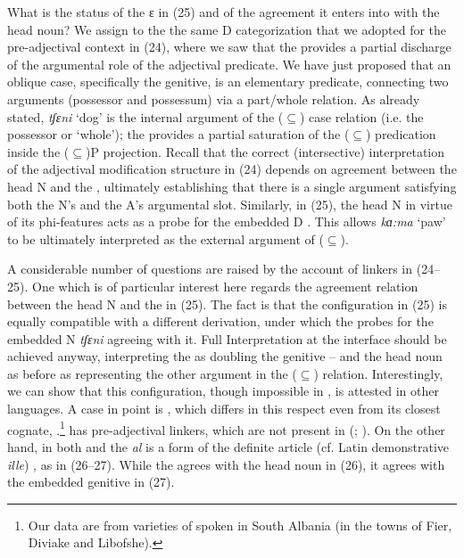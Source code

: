 \documentclass[output=paper]{langsci/langscibook}
\begin{document}
What is the status of the  ɛ in (25) and of the agreement it enters into with the head noun? We assign to the  the same D categorization that we adopted for the pre-ad\-jec\-ti\-val context in (24), where we saw that the  provides a partial discharge of the argumental role of the adjectival predicate. We have just proposed that an oblique case, specifically the genitive, is an elementary predicate, connecting two arguments (possessor and possessum) via a part\slash whole relation. As already stated, \textit{tʃɛni} ‘dog’ is the internal argument of the ($\subseteq$) case relation (i.e. the possessor or ‘whole’); the  provides a partial saturation of the ($\subseteq$) predication inside the ($\subseteq$)P projection. Recall that the correct (intersective) interpretation of the adjectival modification structure in (24) depends on agreement between the head N and the , ultimately establishing that there is a single argument satisfying both the N’s and the A’s argumental slot. Similarly, in (25), the head N in virtue of its phi-features acts as a probe for the embedded D . This allows \textit{kɑ:ma} ‘paw’ to be ultimately interpreted as the external argument of ($\subseteq$).

A considerable number of questions are raised by the account of linkers in (24--25). One which is of particular interest here regards the agreement relation between the head N and the  in (25). The fact is that the configuration in (25) is equally compatible with a different derivation, under which the  probes for the embedded N \textit{tʃɛni} agreeing with it. Full Interpretation at the interface should be achieved anyway, interpreting the  as doubling the genitive – and the head noun as before as representing the other argument in the ($\subseteq$) relation. Interestingly, we can show that this configuration, though impossible in , is attested in other languages. A case in point is , which differs in this respect even from its closest cognate, .\footnote{Our data are from varieties of  spoken in South Albania (in the towns of Fier, Diviake and Libofshe).}  has pre-ad\-jec\-ti\-val linkers, which are not present in  (\citealt{Campos2008}; \citealt{Cornilescu2013}). On the other hand, in both  and  the  \textit{al} is a form of the definite article (cf. Latin demonstrative \textit{ille}) \citep{Giurgea2012}, as in (26--27). While the  agrees with the head noun in  (26), it agrees with the embedded genitive in  (27).\largerpage[-1]
\end{document}
